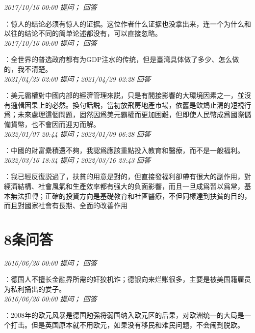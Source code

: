 \documentclass[twocolumn]{ctexart}
\begin{document}
\textit{\hfill\noindent\small 2017/10/16 00:00 提问； 回答}

：惊人的结论必须有惊人的证据。这位作者什么证据也没拿出来，连一个为什么和以往的结论不同的简单论述都没有，可以直接忽略。\\

\textit{\hfill\noindent\small 2017/10/16 00:00 提问； 回答}

：全世界的普选政府都有为GDP注水的传统，但是臺湾具体做了多少、怎么做的，我不清楚。\\

\textit{\hfill\noindent\small 2021/04/29 02:00 提问；2021/04/29 02:28 回答}

：美元霸權對中國内部的經濟管理來説，只是有間接影響的大環境因素之一，並沒有邏輯因果上的必然。換句話説，當初放飛房地產市場，依舊是飲鴆止渴的短視行爲；未來處理這個問題，固然因爲美元霸權而更加困難，但即使人民幣成爲國際儲備貨幣，也不會因而迎刃而解。
\\

\textit{\hfill\noindent\small 2022/01/07 20:44 提问；2022/01/09 06:28 回答}

：中國的財富纍積還不夠，我認爲應該重點投入教育和醫療，而不是一般福利。
\\

\textit{\hfill\noindent\small 2022/03/16 18:34 提问；2022/03/16 23:43 回答}

：我已經反復説過了，扶貧的用意是對的，但直接發福利卻帶有很大的副作用，對經濟結構、社會風氣和生產效率都有强大的負面影響，而且一旦成爲習以爲常，基本無法扭轉；正確的投資方向是基礎教育和社區醫療，不但同樣達到扶貧的目的，而且對國家社會有長期、全面的改善作用
\\

\section{8条问答}

\textit{\hfill\noindent\small 2016/06/26 00:00 提问； 回答}

：德国人不擅长金融界所需的奸狡机诈；德银向来烂账很多，主要是被美国籍雇员为私利捅出的娄子。\\

\textit{\hfill\noindent\small 2016/06/26 00:00 提问； 回答}

：2008年的欧元风暴是德国勉强将弱国纳入欧元区的后果，对欧洲统一的大局是一个打击。但是英国原本就不用欧元，如果没有移民和难民问题，不会闹到脱欧。\\
\end{document}
